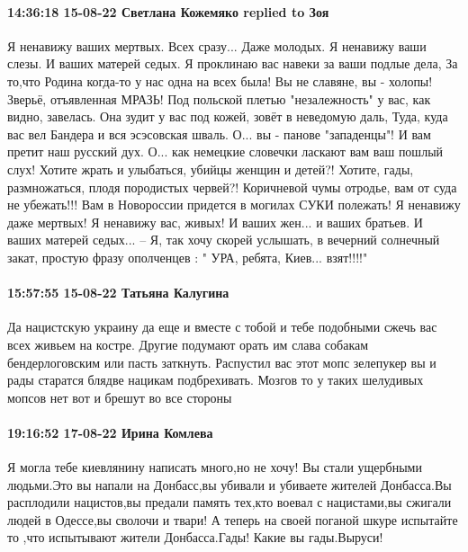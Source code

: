  
 
 
 
 

\paragraph{14:36:18 15-08-22 Светлана Кожемяко replied to Зоя}

\obeycr
Я ненавижу ваших мертвых. Всех сразу... Даже молодых.
Я ненавижу ваши слезы. И ваших матерей седых.
Я проклинаю вас навеки за ваши подлые дела,
За то,что Родина когда-то у нас одна на всех была!
Вы не славяне, вы - холопы! Зверьё, отъявленная МРАЗЬ!
Под польской плетью "незалежность" у вас, как видно, завелась.
Она зудит у вас под кожей, зовёт в неведомую даль,
Туда, куда вас вел Бандера и вся эсэсовская шваль.
О... вы - панове "западенцы"! И вам претит наш русский дух.
О... как немецкие словечки ласкают вам ваш пошлый слух!
Хотите жрать и улыбаться, убийцы женщин и детей?!
Хотите, гады, размножаться, плодя породистых червей?!
Коричневой чумы отродье, вам от суда не убежать!!!
Вам в Новороссии придется в могилах СУКИ полежать!
Я ненавижу даже мертвых! Я ненавижу вас, живых!
И ваших жен... и ваших братьев. И ваших матерей седых...
-- Я, так хочу скорей услышать,
в вечерний солнечный закат,
простую фразу ополченцев :
" УРА, ребята, Киев... взят!!!!"
\restorecr

\paragraph{15:57:55 15-08-22 Татьяна Калугина}

Да нацистскую украину да еще и вместе с тобой и тебе подобными сжечь вас всех
живьем на костре. Другие подумают орать им слава собакам бендерлоговским или
пасть заткнуть. Распустил вас этот мопс зелепукер вы и рады старатся блядве
нацикам подбрехивать. Мозгов то у таких шелудивых мопсов нет вот и брешут во
все стороны

\paragraph{19:16:52 17-08-22 Ирина Комлева}

Я могла тебе киевлянину написать много,но не хочу! Вы стали ущербными
людьми.Это вы напали на Донбасс,вы убивали и убиваете жителей Донбасса.Вы
расплодили нацистов,вы предали память тех,кто воевал с нацистами,вы сжигали
людей в Одессе,вы сволочи и твари! А теперь на своей поганой шкуре испытайте то
,что испытывают жители Донбасса.Гады! Какие вы гады.Выруси!
